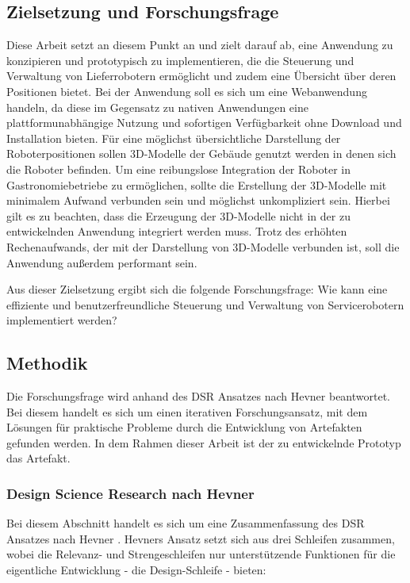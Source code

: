 \subsection{Zielsetzung und Forschungsfrage}
Diese Arbeit setzt an diesem Punkt an und zielt darauf ab, eine Anwendung zu konzipieren und prototypisch zu implementieren, die die Steuerung und Verwaltung von Lieferrobotern ermöglicht und zudem eine Übersicht über deren Positionen bietet. Bei der Anwendung soll es sich um eine Webanwendung handeln, da diese im Gegensatz zu nativen Anwendungen eine plattformunabhängige Nutzung und sofortigen Verfügbarkeit ohne Download und Installation bieten. Für eine möglichst übersichtliche Darstellung der Roboterpositionen sollen 3D-Modelle der Gebäude genutzt werden in denen sich die Roboter befinden. Um eine reibungslose Integration der Roboter in Gastronomiebetriebe zu ermöglichen, sollte die Erstellung der 3D-Modelle mit minimalem Aufwand verbunden sein und möglichst unkompliziert sein. Hierbei gilt es zu beachten, dass die Erzeugung der 3D-Modelle nicht in der zu entwickelnden Anwendung integriert werden muss. Trotz des erhöhten Rechenaufwands, der mit der Darstellung von 3D-Modelle verbunden ist, soll die Anwendung außerdem performant sein.

Aus dieser Zielsetzung ergibt sich die folgende Forschungsfrage: Wie kann eine effiziente und benutzerfreundliche Steuerung und Verwaltung von Servicerobotern implementiert werden?

\subsection{Methodik}
Die Forschungsfrage wird anhand des \ac{DSR} Ansatzes nach Hevner \cite{Hevner2004} beantwortet. Bei diesem handelt es sich um einen iterativen Forschungsansatz, mit dem Lösungen für praktische Probleme durch die Entwicklung von Artefakten gefunden werden. In dem Rahmen dieser Arbeit ist der zu entwickelnde Prototyp das Artefakt.

\subsubsection{Design Science Research nach Hevner}
Bei diesem Abschnitt handelt es sich um eine Zusammenfassung des \ac{DSR} Ansatzes nach Hevner \cite[S.~79-81]{Hevner2004}. Hevners Ansatz setzt sich aus drei Schleifen zusammen, wobei die Relevanz- und Strengeschleifen nur unterstützende Funktionen für die eigentliche Entwicklung - die Design-Schleife - bieten:

